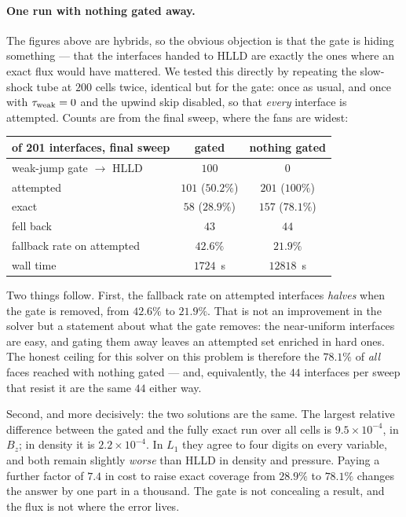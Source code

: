 \paragraph{One run with nothing gated away.} The figures above are hybrids,
so the obvious objection is that the gate is hiding something --- that the
interfaces handed to HLLD are exactly the ones where an exact flux would
have mattered. We tested this directly by repeating the slow-shock tube at
$200$ cells twice, identical but for the gate: once as usual, and once with
$\tau_{\rm weak} = 0$ and the upwind skip disabled, so that \emph{every}
interface is attempted. Counts are from the final sweep, where the fans are
widest:

\begin{center}
\begin{tabular}{lcc}
\toprule
of 201 interfaces, final sweep & gated & nothing gated \\
\midrule
weak-jump gate $\rightarrow$ HLLD & $100$ & $0$ \\
attempted                          & $101$ ($50.2\%$) & $201$ ($100\%$) \\
exact                              & $58$ ($28.9\%$)  & $157$ ($\mathbf{78.1\%}$) \\
fell back                          & $43$             & $44$ \\
\midrule
fallback rate on attempted         & $42.6\%$ & $\mathbf{21.9\%}$ \\
wall time                          & $1724$~s & $12818$~s \\
\bottomrule
\end{tabular}
\end{center}

Two things follow. First, the fallback rate on attempted interfaces
\emph{halves} when the gate is removed, from $42.6\%$ to $21.9\%$. That is
not an improvement in the solver but a statement about what the gate
removes: the near-uniform interfaces are easy, and gating them away leaves
an attempted set enriched in hard ones. The honest ceiling for this solver
on this problem is therefore the $78.1\%$ of \emph{all} faces reached with
nothing gated --- and, equivalently, the $44$ interfaces per sweep that
resist it are the same $44$ either way.

Second, and more decisively: the two solutions are the same. The largest
relative difference between the gated and the fully exact run over all cells
is $9.5\times10^{-4}$, in $B_z$; in density it is $2.2\times10^{-4}$. In
$L_1$ they agree to four digits on every variable, and both remain slightly
\emph{worse} than HLLD in density and pressure. Paying a further factor of
$7.4$ in cost to raise exact coverage from $28.9\%$ to $78.1\%$ changes the
answer by one part in a thousand. The gate is not concealing a result, and
the flux is not where the error lives.


